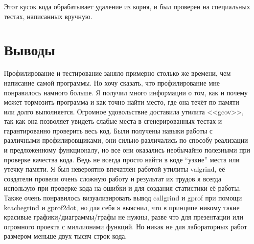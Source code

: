 \documentclass[12pt]{article}
\begin{document}
Этот кусок кода обрабатывает удаление из корня, и был проверен на специальных тестах, написанных вручную.

\section*{Выводы}

Профилирование и тестирование заняло примерно столько же времени, чем написание самой программы. Но хочу сказать, что профилирование мне понравилось намного больше. Я получил много информации о том, как и почему может тормозить программа и как точно найти место, где она течёт по памяти или долго выполняется. Огромное удовольствие доставила утилита <<gcov>>, так как она позволяет увидеть слабые места в сгенерированных тестах и гарантированно проверить весь код. Были получены навыки работы с различными профилировщиками, они сильно различались по способу реализации и предложенному функционалу, но все они оказались необычайно полезными при проверке качества кода. Ведь не всегда просто найти в коде ``узкие'' места или утечку памяти. Я был невероятно впечатлён работой утилиты valgrind, её создатели провели очень сложную работу и результат их трудов я всегда использую при проверке кода на ошибки и для создания статистики её работы. Также очень понравилось визуализировать вывод callgrind и gprof при помощи kcachegrind и gprof2dot, но для себя я выяснил, что в принципе никому такие красивые графики/диаграммы/графы не нужны, разве что для презентации или огромного проекта с миллионами функций. Но никак не для лабораторных работ размером меньше двух тысяч строк кода.
\pagebreak
\end{document}
